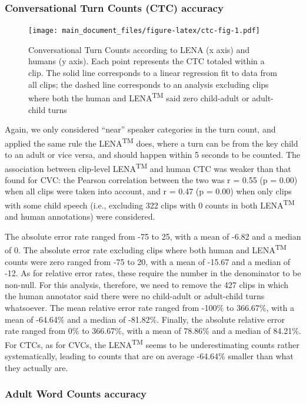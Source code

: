 \documentclass[english,floatsintext,man]{apa6}
\begin{document}
\subsubsection{Conversational Turn Counts (CTC)
accuracy}\label{conversational-turn-counts-ctc-accuracy}

\begin{figure}
\centering
\texttt{[image: main\_document\_files/figure-latex/ctc-fig-1.pdf]}
\caption{\label{fig:ctc-fig}Conversational Turn Counts according to LENA (x
axis) and humans (y axis). Each point represents the CTC totaled within
a clip. The solid line corresponds to a linear regression fit to data
from all clips; the dashed line corresponds to an analysis excluding
clips where both the human and LENA\textsuperscript{TM} said zero
child-adult or adult-child turns}
\end{figure}

Again, we only considered \enquote{near} speaker categories in the turn
count, and applied the same rule the LENA\textsuperscript{TM} does,
where a turn can be from the key child to an adult or vice versa, and
should happen within 5 seconds to be counted. The association between
clip-level LENA\textsuperscript{TM} and human CTC was weaker than that
found for CVC: the Pearson correlation between the two was r = 0.55 (p =
0.00) when all clips were taken into account, and r = 0.47 (p = 0.00)
when only clips with some child speech (i.e., excluding 322 clips with 0
counts in both LENA\textsuperscript{TM} and human annotations) were
considered.

The absolute error rate ranged from -75 to 25, with a mean of -6.82 and
a median of 0. The absolute error rate excluding clips where both human
and LENA\textsuperscript{TM} counts were zero ranged from -75 to 20,
with a mean of -15.67 and a median of -12. As for relative error rates,
these require the number in the denominator to be non-null. For this
analysis, therefore, we need to remove the 427 clips in which the human
annotator said there were no child-adult or adult-child turns
whatsoever. The mean relative error rate ranged from -100\% to 366.67\%,
with a mean of -64.64\% and a median of -81.82\%. Finally, the absolute
relative error rate ranged from 0\% to 366.67\%, with a mean of 78.86\%
and a median of 84.21\%. For CTCs, as for CVCs, the
LENA\textsuperscript{TM} seems to be underestimating counts rather
systematically, leading to counts that are on average -64.64\% smaller
than what they actually are.

\subsubsection{Adult Word Counts
accuracy}\label{adult-word-counts-accuracy}
\end{document}
